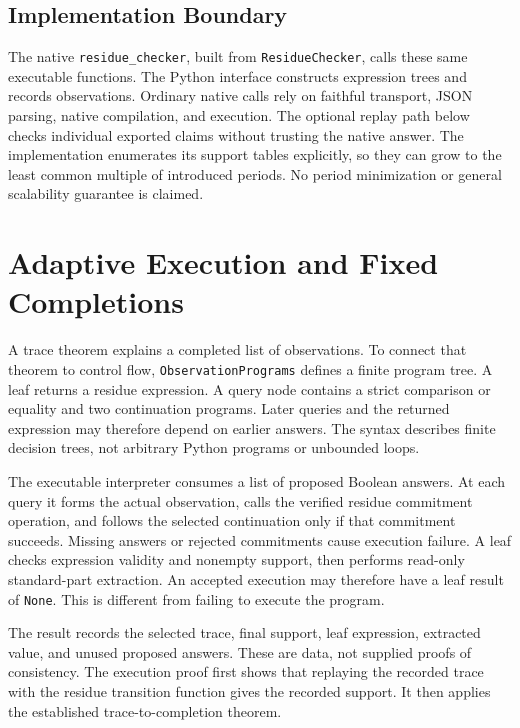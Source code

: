 \documentclass[11pt,a4paper]{article}
\theoremstyle{result}
\theoremstyle{definition}
\newcommand{\code}[1]{\texttt{#1}}
\begin{document}
\subsection{Implementation Boundary}

The native \code{residue\_checker}, built from \code{ResidueChecker}, calls these same executable functions. The Python interface constructs expression trees and records observations. Ordinary native calls rely on faithful transport, JSON parsing, native compilation, and execution. The optional replay path below checks individual exported claims without trusting the native answer. The implementation enumerates its support tables explicitly, so they can grow to the least common multiple of introduced periods. No period minimization or general scalability guarantee is claimed.

\section{Adaptive Execution and Fixed Completions}\label{sec:programs}

A trace theorem explains a completed list of observations. To connect that theorem to control flow, \code{ObservationPrograms} defines a finite program tree. A leaf returns a residue expression. A query node contains a strict comparison or equality and two continuation programs. Later queries and the returned expression may therefore depend on earlier answers. The syntax describes finite decision trees, not arbitrary Python programs or unbounded loops.

The executable interpreter consumes a list of proposed Boolean answers. At each query it forms the actual observation, calls the verified residue commitment operation, and follows the selected continuation only if that commitment succeeds. Missing answers or rejected commitments cause execution failure. A leaf checks expression validity and nonempty support, then performs read-only standard-part extraction. An accepted execution may therefore have a leaf result of \code{None}. This is different from failing to execute the program.

The result records the selected trace, final support, leaf expression, extracted value, and unused proposed answers. These are data, not supplied proofs of consistency. The execution proof first shows that replaying the recorded trace with the residue transition function gives the recorded support. It then applies the established trace-to-completion theorem.
\end{document}
